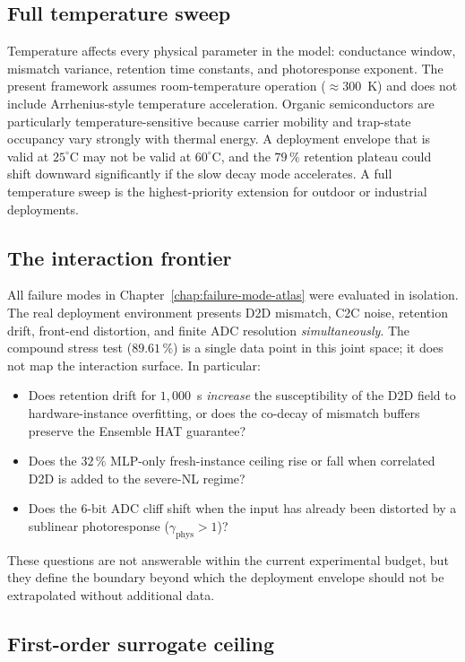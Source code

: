 \subsection{Full temperature sweep}

Temperature affects every physical parameter in the model: conductance window, mismatch variance, retention time constants, and photoresponse exponent.  The present framework assumes room-temperature operation ($\approx 300$~K) and does not include Arrhenius-style temperature acceleration.  Organic semiconductors are particularly temperature-sensitive because carrier mobility and trap-state occupancy vary strongly with thermal energy.  A deployment envelope that is valid at $25^{\circ}$C may not be valid at $60^{\circ}$C, and the $79\,\%$ retention plateau could shift downward significantly if the slow decay mode accelerates.  A full temperature sweep is the highest-priority extension for outdoor or industrial deployments.

\subsection{The interaction frontier}

All failure modes in Chapter~\ref{chap:failure-mode-atlas} were evaluated in isolation.  The real deployment environment presents D2D mismatch, C2C noise, retention drift, front-end distortion, and finite ADC resolution \emph{simultaneously}.  The compound stress test ($89.61\,\%$) is a single data point in this joint space; it does not map the interaction surface.  In particular:
\begin{itemize}
    \item Does retention drift for $1{,}000$~s \emph{increase} the susceptibility of the D2D field to hardware-instance overfitting, or does the co-decay of mismatch buffers preserve the Ensemble HAT guarantee?
    \item Does the $32\,\%$ MLP-only fresh-instance ceiling rise or fall when correlated D2D is added to the severe-NL regime?
    \item Does the 6-bit ADC cliff shift when the input has already been distorted by a sublinear photoresponse ($\gamma_{\mathrm{phys}} > 1$)?
\end{itemize}
These questions are not answerable within the current experimental budget, but they define the boundary beyond which the deployment envelope should not be extrapolated without additional data.

\subsection{First-order surrogate ceiling}

